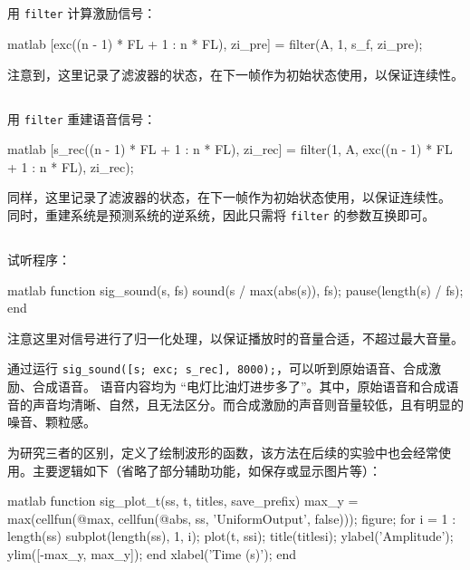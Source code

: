 \documentclass[a4paper]{article}  %
\begin{document}
\subsection{}

用 \texttt{filter} 计算激励信号：
\begin{codeblock}{matlab}
[exc((n - 1) * FL + 1 : n * FL), zi_pre] = filter(A, 1, s_f, zi_pre);
\end{codeblock}

注意到，这里记录了滤波器的状态，在下一帧作为初始状态使用，以保证连续性。

\subsection{}

用 \texttt{filter} 重建语音信号：
\begin{codeblock}{matlab}
[s_rec((n - 1) * FL + 1 : n * FL), zi_rec] = filter(1, A, exc((n - 1) * FL + 1 : n * FL), zi_rec);
\end{codeblock}

同样，这里记录了滤波器的状态，在下一帧作为初始状态使用，以保证连续性。
同时，重建系统是预测系统的逆系统，因此只需将 \texttt{filter} 的参数互换即可。

\subsection{}

试听程序：
\begin{codeblock}{matlab}
function sig_sound(s, fs)
    sound(s / max(abs(s)), fs);
    pause(length(s) / fs);
end
\end{codeblock}

注意这里对信号进行了归一化处理，以保证播放时的音量合适，不超过最大音量。

通过运行 \texttt{sig\_sound([s; exc; s\_rec], 8000);}，可以听到原始语音、合成激励、合成语音。
语音内容均为 “电灯比油灯进步多了”。其中，原始语音和合成语音的声音均清晰、自然，且无法区分。而合成激励的声音则音量较低，且有明显的噪音、颗粒感。

为研究三者的区别，定义了绘制波形的函数，该方法在后续的实验中也会经常使用。主要逻辑如下（省略了部分辅助功能，如保存或显示图片等）：
\begin{codeblock}{matlab}
function sig_plot_t(ss, t, titles, save_prefix)
    max_y = max(cellfun(@max, cellfun(@abs, ss, 'UniformOutput', false)));
    figure;
    for i = 1 : length(ss)
        subplot(length(ss), 1, i);
        plot(t, ss{i});
        title(titles{i});
        ylabel('Amplitude');
        ylim([-max_y, max_y]);
    end
    xlabel('Time (s)');
end
\end{codeblock}
\end{document}
